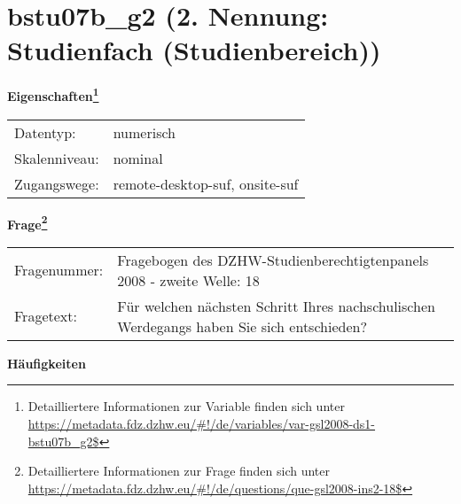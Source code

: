 
    \setcounter{footnote}{0}

    \vspace*{-1.8cm}
	\section{bstu07b\_g2 (2. Nennung: Studienfach (Studienbereich))}
	\label{section:bstu07b_g2}



    \vspace*{0.5cm}
    \noindent\textbf{Eigenschaften\footnote{Detailliertere Informationen zur Variable finden sich unter
		\url{https://metadata.fdz.dzhw.eu/\#!/de/variables/var-gsl2008-ds1-bstu07b_g2$}}}\\
	\begin{tabularx}{\hsize}{@{}lX}
	Datentyp: & numerisch \\
	Skalenniveau: & nominal \\
	Zugangswege: &
	  remote-desktop-suf, 
	  onsite-suf
 \\
    \end{tabularx}



				\vspace*{0.5cm}
                \noindent\textbf{Frage\footnote{Detailliertere Informationen zur Frage finden sich unter
		              \url{https://metadata.fdz.dzhw.eu/\#!/de/questions/que-gsl2008-ins2-18$}}}\\
				\begin{tabularx}{\hsize}{@{}lX}
					Fragenummer: &
					  Fragebogen des DZHW-Studienberechtigtenpanels 2008 - zweite Welle:
					  18
 \\
					Fragetext: & Für welchen nächsten Schritt Ihres nachschulischen Werdegangs haben Sie sich entschieden? \\
				\end{tabularx}





        		\vspace*{0.5cm}
                \noindent\textbf{Häufigkeiten}

